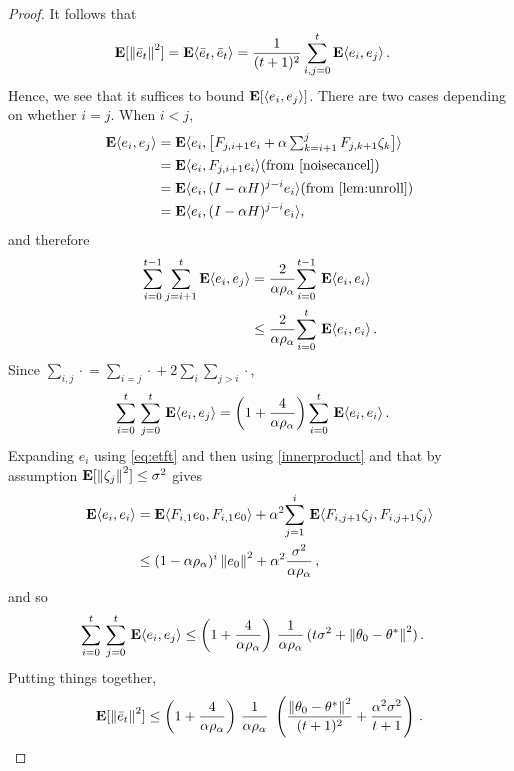 \begin{proof}
It follows that 
\begin{align*}
\E[\norm{\eb_t}^2]&=\E\ip{\eb_t,\eb_t}
=\frac{1}{(t+1)^2} \sum_{i,j=0}^t \E\ip{e_i,e_j}\,.
\end{align*}
Hence, we see that it suffices to bound $\EE{\ip{ e_i,  e_j }}$.
There are two cases depending on whether $i=j$. When $i< j$,
\begin{align*}
\E\ip{e_i,e_j}
&=\E \ip{e_i,\big[F_{j,i+1} e_i+\alpha\textstyle\sum_{k=i+1}^j F_{j,k+1}\zeta_{k}\big]}\\
&=\E\ip{e_i,F_{j,i+1} e_i}  \text{(from \cref{noisecancel})}\\
&=\E\ip{e_i, (I-\alpha H)^{j-i} e_i} \text{(from \cref{lem:unroll})}\\
&=\E\ip{e_i,(I-\alpha H)^{j-i}e_i},
\end{align*}
and therefore
\begin{align*}
\label{inter}
\sum_{i=0}^{t-1}\sum_{j=i+1}^t \E\ip{ e_i,e_j}
&=\frac2{\alpha\rho_{\alpha}} \ous{\sum}{i=0}{t-1}\E\ip{e_i,e_i}\\
&\leq \frac2{\alpha\rho_{\alpha}}\ous{\sum}{i=0}{t}\E\ip{e_i, e_i}\,.
\end{align*}
Since $\sum_{i,j}\cdot{} = \sum_{i=j}\cdot{} + 2 \sum_i \sum_{j>i} \cdot{}$,
\begin{align*}
\ous{\sum}{i=0}{t}\ous{\sum}{j=0}{t} \E\ip{e_i,e_j}&= \left(1+\frac4{\alpha\rho_{\alpha}}\right)\ous{\sum}{i=0}{t}\E\ip{e_i,e_i}\,.
\end{align*}
Expanding $e_i$ using \eqref{eq:etft} and then using \cref{innerproduct} and that by assumption $\EE{ \norm{\zeta_j}^2 } \le \sigma^2$ gives
\begin{align*}
\E\ip{e_i,e_i}&=\E\ip{F_{i,1}e_0,F_{i,1}e_0}+\alpha^2\ous{\sum}{j=1}{i}\E\ip{ F_{i,j+1}\zeta_j, F_{i,j+1}\zeta_j}\\
&\leq (1-\alpha\rho_{\alpha})^i\norm{e_0}^2+ \alpha^2\frac{\sigma^2}{\alpha \rho_\alpha}\,,
\end{align*}
and so
\begin{align*}
\ous{\sum}{i=0}{t}\ous{\sum}{j=0}{t} \E\ip{e_i,e_j}
&\leq \left(1+\frac4{\alpha\rho_{\alpha}}\right)\, \frac1{\alpha\rho_{\alpha}}\, (t\sigma^2+\norm{\theta_0-\ts}^2)\,.
\end{align*}
Putting things together,
\begin{align}
\E[\norm{\eb_t}^2]
\leq \left(1+\frac4{\alpha\rho_{\alpha}}\right)\, \frac1{\alpha\rho_{\alpha}}\, \,
\left(\frac{\norm{\theta_0-\ts}^2}{(t+1)^2}+ \frac{\alpha^2\sigma^2}{t+1} \right)\,.
\end{align}
\end{proof}

